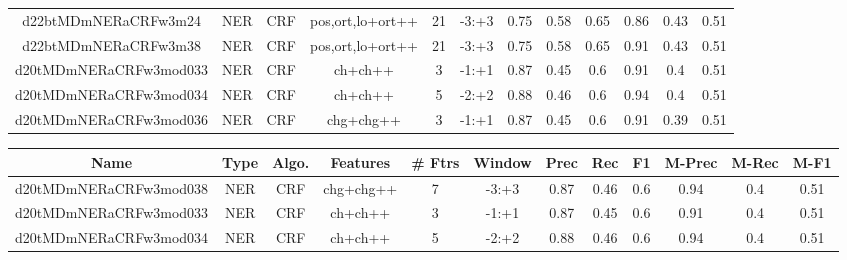 \documentclass[a4paper]{article}
\begin{document}
\begin{landscape}
\begin{center}
\begin{tabular}{ |c|c|c|c|c|c|c|c|c|c|c|c|}
 
 	
 	\small{ d22btMDmNERaCRFw3m24 } & \small{ NER} & \small{  CRF }  & pos,ort,lo+ort++  &  21 &  \small{  -3:+3 }  &  0.75 & 0.58 & 0.65  &  0.86 & 0.43 & 0.51 \\
 	

 
 	
 	\small{ d22btMDmNERaCRFw3m38 } & \small{ NER} & \small{  CRF }  & pos,ort,lo+ort++  &  21 &  \small{  -3:+3 }  &  0.75 & 0.58 & 0.65  &  0.91 & 0.43 & 0.51 \\
 	

 
 	
 	\small{ d20tMDmNERaCRFw3mod033 } & \small{ NER} & \small{  CRF }  & ch+ch++  &  3 &  \small{  -1:+1 }  &  0.87 & 0.45 & 0.6  &  0.91 & 0.4 & 0.51 \\
 	

 
 	
 	\small{ d20tMDmNERaCRFw3mod034 } & \small{ NER} & \small{  CRF }  & ch+ch++  &  5 &  \small{  -2:+2 }  &  0.88 & 0.46 & 0.6  &  0.94 & 0.4 & 0.51 \\
 	

 
 	
 	\small{ d20tMDmNERaCRFw3mod036 } & \small{ NER} & \small{  CRF }  & chg+chg++  &  3 &  \small{  -1:+1 }  &  0.87 & 0.45 & 0.6  &  0.91 & 0.39 & 0.51 \\
 	
 \hline
\end{tabular}
\end{center}




\begin{center}
\begin{tabular}{ |c|c|c|c|c|c|c|c|c|c|c|c|} 
 \hline
 	Name & Type & Algo. & Features & \# Ftrs & Window & Prec & Rec & F1 & M-Prec & M-Rec & M-F1\\
 \hline

 	

 
 	
 	\small{ d20tMDmNERaCRFw3mod038 } & \small{ NER} & \small{  CRF }  & chg+chg++  &  7 &  \small{  -3:+3 }  &  0.87 & 0.46 & 0.6  &  0.94 & 0.4 & 0.51 \\
 	

 
 	
 	\small{ d20tMDmNERaCRFw3mod033 } & \small{ NER} & \small{  CRF }  & ch+ch++  &  3 &  \small{  -1:+1 }  &  0.87 & 0.45 & 0.6  &  0.91 & 0.4 & 0.51 \\
 	

 
 	
 	\small{ d20tMDmNERaCRFw3mod034 } & \small{ NER} & \small{  CRF }  & ch+ch++  &  5 &  \small{  -2:+2 }  &  0.88 & 0.46 & 0.6  &  0.94 & 0.4 & 0.51 \\
 	


\end{tabular}
\end{center}
\end{landscape}
\end{document}
